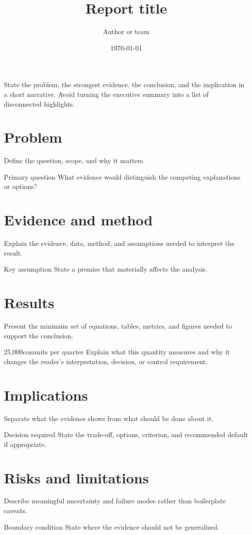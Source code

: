 \documentclass{reportkit}
\title{Report title}
\author{Author or team}
\date{\today}
\begin{document}
\maketitle

\begin{execsummary}
State the problem, the strongest evidence, the conclusion, and the implication in a short narrative.
Avoid turning the executive summary into a list of disconnected highlights.
\end{execsummary}

\section{Problem}
Define the question, scope, and why it matters.

\begin{researchproblem}{Primary question}
What evidence would distinguish the competing explanations or options?
\end{researchproblem}

\section{Evidence and method}
Explain the evidence, data, method, and assumptions needed to interpret the result.

\begin{assumption}{Key assumption}
State a premise that materially affects the analysis.
\end{assumption}

\section{Results}
Present the minimum set of equations, tables, metrics, and figures needed to support the conclusion.

\begin{metric}{25,000}{commits per quarter}
Explain what this quantity measures and why it changes the reader's interpretation, decision, or
control requirement.
\end{metric}

\section{Implications}
Separate what the evidence shows from what should be done about it.

\begin{decisionpoint}{Decision required}
State the trade-off, options, criterion, and recommended default if appropriate.
\end{decisionpoint}

\section{Risks and limitations}
Describe meaningful uncertainty and failure modes rather than boilerplate caveats.

\begin{limitationnote}{Boundary condition}
State where the evidence should not be generalized.
\end{limitationnote}
\end{document}

